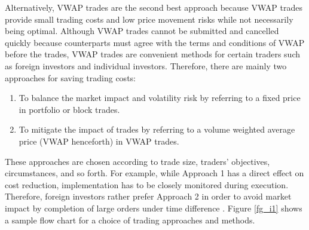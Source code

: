 Alternatively, VWAP trades are the second best approach because VWAP trades provide small trading costs and low price movement risks while not necessarily being optimal.  Although VWAP trades cannot be submitted and cancelled quickly because counterparts must agree with the terms and conditions of VWAP before the trades, VWAP trades are convenient methods for certain traders such as foreign investors and individual investors.  Therefore, there are mainly two approaches for saving trading costs: 
\begin{enumerate}
\item To balance the market impact and volatility risk by referring to a fixed price in portfolio or block trades.
\item To mitigate the impact of trades by referring to a volume weighted average price (VWAP henceforth) in VWAP trades.  
\end{enumerate}
These approaches are chosen according to trade size, traders' objectives, circumstances, and so forth.  For example, while Approach 1 has a direct effect on cost reduction, implementation has to be closely monitored during execution.  Therefore, foreign investors rather prefer Approach 2 in order to avoid market impact by completion of large orders under time difference .  Figure \ref{fg_i1} shows a sample flow chart for a choice of trading approaches and methods.


